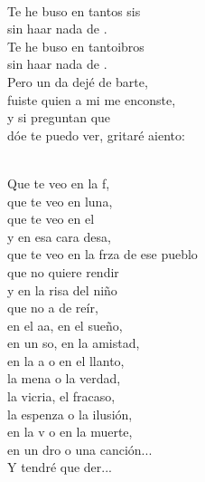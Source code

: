 \documentclass[12pt]{article}
\begin{document}
\begin{multicols*}{2}
\begin{cancion}%
	    \\
	Te he buso en tantos sis \\
	sin haar nada de . \\
	Te he buso en tantoibros\\
	sin haar nada de . \\
	Pero un da dejé de barte, \\
	fuiste  quien a mi me enconste, \\
	y si  preguntan que \\
	dóe te puedo ver, gritaré aiento:\\\jump\\
	\begin{chorus}%
	Que te veo en la f, \\
	que te veo en luna,\\
	que te veo en el  \\
	y en esa cara desa,\\
	que te veo en la frza de ese pueblo\\
	que no  quiere rendir\\
	y en la risa del niño \\
	que no a de reír,\\
	en el aa, en el sueño, \\
	en un so, en la amistad,\\
	en la a o en el llanto, \\
	la mena o la verdad,\\
	la vicria, el fracaso, \\
	la espenza o la ilusión,\\
	en la v o en la muerte, \\
	en un dro o una canción...\\
	Y tendré que der...\\

\end{chorus}
\end{cancion}
\end{multicols*}
\end{document}
